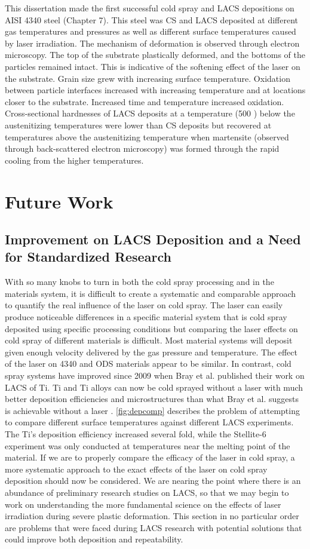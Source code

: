 	This dissertation made the first successful cold spray and LACS depositions on AISI 4340 steel (Chapter 7). This steel was CS and LACS deposited at different gas temperatures and pressures as well as different surface temperatures caused by laser irradiation. The mechanism of deformation is observed through electron microscopy. The top of the substrate plastically deformed, and the bottoms of the particles remained intact. This is indicative of the softening effect of the laser on the substrate. Grain size grew with increasing surface temperature. Oxidation between particle interfaces increased with increasing temperature and at locations closer to the substrate. Increased time and temperature increased oxidation. Cross-sectional hardnesses of LACS deposits at a temperature (500 \celsius{}) below the austenitizing temperatures were lower than CS deposits but recovered at temperatures above the austenitizing temperature when martensite (observed through back-scattered electron microscopy) was formed through the rapid cooling from the higher temperatures.
	
\section*{Future Work}
	\subsection*{Improvement on LACS Deposition and a Need for Standardized Research}	
		With so many knobs to turn in both the cold spray processing and in the materials system, it is difficult to create a systematic and comparable approach to quantify the real influence of the laser on cold spray. The laser can easily produce noticeable differences in a specific material system that is cold spray deposited using specific processing conditions but comparing the laser effects on cold spray of different materials is difficult. Most material systems will deposit given enough velocity delivered by the gas pressure and temperature. The effect of the laser on 4340 and ODS materials appear to be similar. In contrast, cold spray systems have improved since 2009 when Bray et al. published their work on LACS of Ti. Ti and Ti alloys can now be cold sprayed without a laser with much better deposition efficiencies and microstructures than what Bray et al. suggests is achievable without a laser \cite{RN173}. \ref{fig:depcomp}  describes the problem of attempting to compare different surface temperatures against different LACS experiments. The Ti's deposition efficiency increased several fold, while the Stellite-6 experiment was only conducted at temperatures near the melting point of the material. If we are to properly compare the efficacy of the laser in cold spray, a more systematic approach to the exact effects of the laser on cold spray deposition should now be considered. We are nearing the point where there is an abundance of preliminary research studies on LACS, so that we may begin to work on understanding the more fundamental science on the effects of laser irradiation during severe plastic deformation. This section in no particular order are problems that were faced during LACS research with potential solutions that could improve both deposition and repeatability.
	
